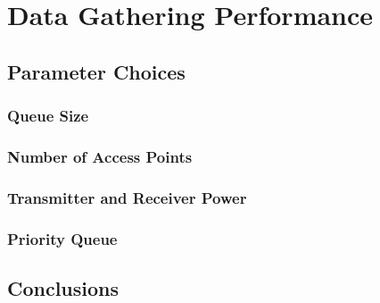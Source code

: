 \chapter{Data Gathering Performance}\label{data_gathering_performance} 
	

    \section{Parameter Choices}\label{data_gathering_performance_parameter_choices}


        \subsection{Queue Size}\label{data_gathering_performance_parameter_choices_queue_size}


        \subsection{Number of Access Points}\label{data_gathering_performance_parameter_choices_number_of_access_points}


        \subsection{Transmitter and Receiver Power}\label{data_gathering_performance_parameter_choices_transmitter_and_reciever_power}


        \subsection{Priority Queue}\label{data_gathering_performance_parameter_choices_priority_queue}



    \section{Conclusions}\label{data_gathering_performance_conclusions}


